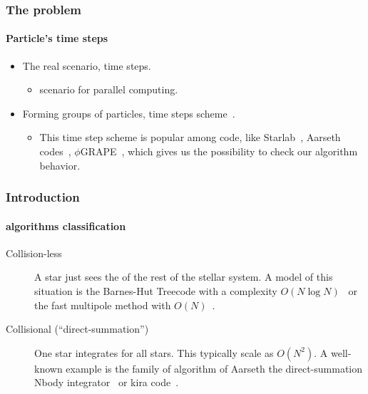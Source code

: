 \begin{frame}
    \frametitle{The {\nbody} problem}
    \framesubtitle{Particle's time steps}

    \begin{itemize}
        \item The real scenario,  time steps.
        \begin{itemize}
            \item {} scenario for parallel computing.
        \end{itemize}
        \item Forming groups of particles,  time steps scheme~\cite{Press86}.
        \begin{itemize}
            \item  This time step scheme is popular among  {\nbody} code,
                like Starlab~\cite{portegies2001, hut2003}, Aarseth {\nbody}
                codes~\cite{Aarseth99, Aarseth03,NitadoriAarseth2012},
                $\phi$GRAPE~\cite{harfst2008},
                which gives us the possibility to check our algorithm behavior.
        \end{itemize}
    \end{itemize}
\end{frame}


\begin{frame}
    \frametitle{Introduction}
    \framesubtitle{{\nbody} algorithms classification}

    \begin{description}
        \item[Collision-less]
            A star just sees the  of the rest of
            the stellar system.
            A model of this situation is the Barnes-Hut Treecode
            with a complexity $O(N\log N)$~\cite{BarnesHut86}
            or the fast multipole method with $O(N)$~\cite{GreendardThesis}.
            \vspace{0.7cm}
        \item[Collisional (``direct-summation'')]
            One star integrates 
            for all stars. This typically scale as $O(N^{2})$.
            A well-known example is the family of algorithm of Aarseth
            the direct-summation {\sc Nbody} integrator~\cite{Aarseth99,Spurzem1999,Aarseth03}
            or {\sc kira} code~\cite{PortegiesZwartEtAl01}.
    \end{description}

\end{frame}

